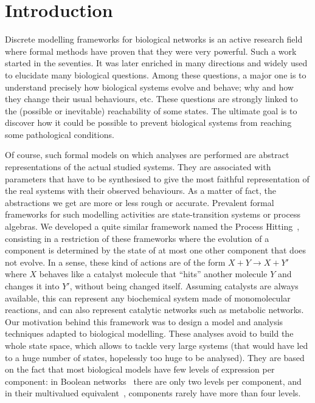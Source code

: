 \section{Introduction}
\label{sec:intro}

Discrete modelling frameworks for biological networks is an active research field where formal methods have proven that they were very powerful.
Such a work started in the seventies.
It was later enriched in many directions and widely used to elucidate many biological questions.
Among these questions, a major one is to understand precisely how biological systems evolve and behave; why and how they change their usual behaviours, etc.
These questions are strongly linked to the (possible or inevitable) reachability of some states.
The ultimate goal is to discover how it could be possible to prevent biological systems from reaching some pathological conditions.

Of course, such formal models on which analyses are performed are abstract representations of the actual studied systems.
They are associated with parameters that have to be synthesised %
to give the most faithful representation of the real systems with their observed behaviours.
As a matter of fact, the abstractions we get are more or less rough or accurate.
Prevalent formal frameworks for such modelling activities are state-transition systems or process algebras. %
We developed a quite similar framework named the Process Hitting~\cite{PMR10-TCSB},
consisting in a restriction of these frameworks where the evolution of a component is determined by the state of at most one other component that does not evolve.
In a sense, these kind of actions are of the form $X + Y \rightarrow X + Y'$ where $X$ behaves like a catalyst molecule that “hits” another molecule $Y$ and changes it into $Y'$, without being changed itself.
Assuming catalysts are always available, this can represent any biochemical system made of monomolecular reactions, and can also represent catalytic networks such as metabolic networks.
Our motivation behind this framework was to design a model and analysis techniques adapted to biological modelling.
These analyses avoid to build the whole state space, which allows to tackle very large systems (that would have led to a huge number of states, hopelessly too huge to be analysed).
They are based on the fact that most biological models have few levels of expression per component:
in Boolean networks~\cite{kauffman69,Thomas73} there are only two levels per component, and in their multivalued equivalent~\cite{deJong02}, components rarely have more than four levels.

